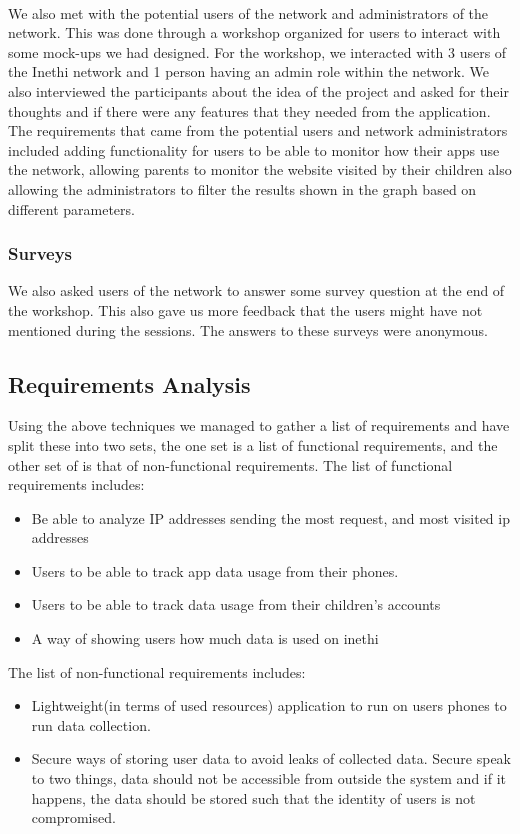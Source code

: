 \paragraph{}
We also met with the potential users of the network and administrators of the network.
This was done through a workshop organized for users to interact with some mock-ups we had designed.
For the workshop, we interacted with 3 users of the Inethi network and 1 person having an admin role within the network.
We also interviewed the participants about the idea of the project and asked for their thoughts and if there were any features that they needed from the application.
The requirements that came from the potential users and network administrators included adding functionality for users to be able to monitor how their apps use the network, allowing parents to monitor the website visited by their children also allowing the administrators to filter the results shown in the graph based on different parameters.
\subsubsection{Surveys}
We also asked users of the network to answer some survey question at the end of the workshop.
This also gave us more feedback that the users might have not mentioned during the sessions.
The answers to these surveys were anonymous.
\subsection{Requirements Analysis}\label{subsec:requirements-analysis}
Using the above techniques we managed to gather a list of requirements and have split these into two sets, the one set is a list of functional requirements, and the other set of is that of non-functional requirements.
The list of functional requirements includes:
\begin{itemize}
   \item Be able to analyze IP addresses sending the most request, and most visited ip addresses
    \item Users to be able to track app data usage from their phones.
   \item Users to be able to track data usage from their children's accounts
    \item A way of showing users how much data is used on inethi
\end{itemize}
The list of non-functional requirements includes:
\begin{itemize}
    \item Lightweight(in terms of used resources) application to run on users phones to run data collection.
    \item Secure ways of storing user data to avoid leaks of collected data.
    Secure speak to two things, data should not be accessible from outside the system and if it happens, the data should be stored such that the identity of users is not compromised.
\end{itemize}
